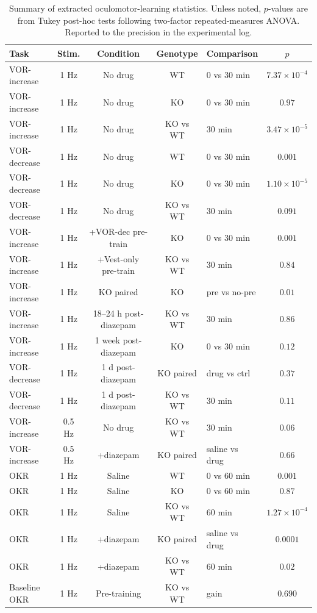 \documentclass[11pt]{article}
\begin{document}
\begin{table}[htbp]
\centering
\caption{Summary of extracted oculomotor-learning statistics. Unless noted,
$p$-values are from Tukey post-hoc tests following two-factor
repeated-measures ANOVA. Reported to the precision in the experimental log.}
\label{tab:summary}
\small
\begin{tabular}{p{2.6cm}cccp{2.3cm}c}
\toprule
Task & Stim. & Condition & Genotype & Comparison & $p$ \\
\midrule
VOR-increase & 1 Hz & No drug & WT  & 0 vs 30 min & $7.37{\times}10^{-4}$ \\
VOR-increase & 1 Hz & No drug & KO  & 0 vs 30 min & $0.97$ \\
VOR-increase & 1 Hz & No drug & KO vs WT & 30 min   & $3.47{\times}10^{-5}$ \\
VOR-decrease & 1 Hz & No drug & WT  & 0 vs 30 min & $0.001$ \\
VOR-decrease & 1 Hz & No drug & KO  & 0 vs 30 min & $1.10{\times}10^{-5}$ \\
VOR-decrease & 1 Hz & No drug & KO vs WT & 30 min   & $0.091$ \\
VOR-increase & 1 Hz & +VOR-dec pre-train & KO  & 0 vs 30 min & $0.001$ \\
VOR-increase & 1 Hz & +Vest-only pre-train & KO vs WT & 30 min & $0.84$ \\
VOR-increase & 1 Hz & KO paired & KO & pre vs no-pre & $0.01$ \\
VOR-increase & 1 Hz & 18--24 h post-diazepam & KO vs WT & 30 min & $0.86$ \\
VOR-increase & 1 Hz & 1 week post-diazepam & KO  & 0 vs 30 min & $0.12$ \\
VOR-decrease & 1 Hz & 1 d post-diazepam & KO paired & drug vs ctrl & $0.37$ \\
VOR-decrease & 1 Hz & 1 d post-diazepam & KO vs WT & 30 min & $0.11$ \\
VOR-increase & 0.5 Hz & No drug & KO vs WT & 30 min & $0.06$ \\
VOR-increase & 0.5 Hz & +diazepam & KO paired & saline vs drug & $0.66$ \\
OKR         & 1 Hz & Saline & WT  & 0 vs 60 min & $0.001$ \\
OKR         & 1 Hz & Saline & KO  & 0 vs 60 min & $0.87$ \\
OKR         & 1 Hz & Saline & KO vs WT & 60 min & $1.27{\times}10^{-4}$ \\
OKR         & 1 Hz & +diazepam & KO paired & saline vs drug & $0.0001$ \\
OKR         & 1 Hz & +diazepam & KO vs WT & 60 min & $0.02$ \\
Baseline OKR & 1 Hz & Pre-training & KO vs WT & gain & $0.690$ \\
\bottomrule
\end{tabular}
\end{table}
\end{document}
